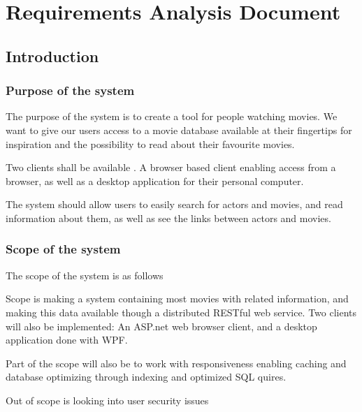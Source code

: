 \chapter{Requirements Analysis Document}

\section{Introduction}
\label{sec:introduction}



\subsection{Purpose of the system}

The purpose of the system is to create a tool for people watching movies. We want to give our users access to a movie database available at their fingertips for inspiration and the possibility to read about their favourite movies.

Two clients shall be available . A browser based client enabling access from a browser, as well as a desktop application for their personal computer.  

The system should allow users to easily search for actors and movies, and read information about them, as well as see the links between actors and movies.




\subsection{Scope of the system}

The scope of the system is as follows

Scope is making a system containing most movies with related information, and making this data available though a distributed RESTful web service. Two clients will also be implemented: An ASP.net web browser client, and a desktop application done with WPF.

Part of the scope will also be to work with responsiveness enabling caching and database optimizing through indexing and optimized SQL quires.

Out of scope is looking into user security issues


